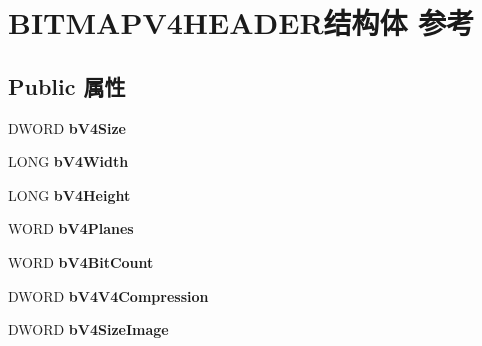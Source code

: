 \hypertarget{struct_b_i_t_m_a_p_v4_h_e_a_d_e_r}{}\section{B\+I\+T\+M\+A\+P\+V4\+H\+E\+A\+D\+E\+R结构体 参考}
\label{struct_b_i_t_m_a_p_v4_h_e_a_d_e_r}
\subsection*{Public 属性}
\begin{DoxyCompactItemize}
\item 
\mbox{\label{struct_b_i_t_m_a_p_v4_h_e_a_d_e_r_af81efc01d51ceea5ac727fbc55cd24cf}} 
D\+W\+O\+RD {\bfseries b\+V4\+Size}
\item 
\mbox{\label{struct_b_i_t_m_a_p_v4_h_e_a_d_e_r_acd195294a30c327f9a247aba88884fcf}} 
L\+O\+NG {\bfseries b\+V4\+Width}
\item 
\mbox{\label{struct_b_i_t_m_a_p_v4_h_e_a_d_e_r_ab10661e1986cc4276de4a43222a9a63c}} 
L\+O\+NG {\bfseries b\+V4\+Height}
\item 
\mbox{\label{struct_b_i_t_m_a_p_v4_h_e_a_d_e_r_a6760cffcff21380c437b405b69e46927}} 
W\+O\+RD {\bfseries b\+V4\+Planes}
\item 
\mbox{\label{struct_b_i_t_m_a_p_v4_h_e_a_d_e_r_ae416cd602aa28818645423027207786f}} 
W\+O\+RD {\bfseries b\+V4\+Bit\+Count}
\item 
\mbox{\label{struct_b_i_t_m_a_p_v4_h_e_a_d_e_r_a7cb8e1f59d25d365f00e53c3a8b00a01}} 
D\+W\+O\+RD {\bfseries b\+V4\+V4\+Compression}
\item 
\mbox{\label{struct_b_i_t_m_a_p_v4_h_e_a_d_e_r_a7aa8c858d4c0f013a79b7779d50f5ee0}} 
D\+W\+O\+RD {\bfseries b\+V4\+Size\+Image}
\item 
\mbox{\label{struct_b_i_t_m_a_p_v4_h_e_a_d_e_r_a04e41db626aa5a5a9b65a870d6b5a1aa}} 

\end{DoxyCompactItemize}
